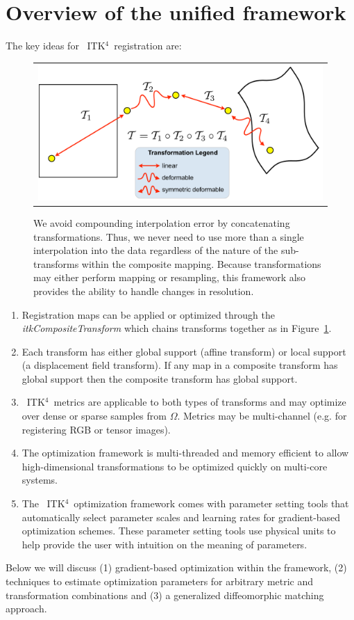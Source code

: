 \documentclass{llncs}
\newcommand{\tk}{~ITK$^{\text{4}}$~}
\begin{document}
\section{Overview of the unified framework}
The key ideas for \tk registration are:
\begin{figure}[t]
\begin{center}
\begin{tabular}{c}
\includegraphics[width=4.5in]{figs/composemap.pdf}
\end{tabular}
\caption{\baselineskip 12pt \small We avoid compounding interpolation
  error by concatenating transformations.  Thus, we never need to use more than
  a single interpolation into the data regardless of the nature of the
  sub-transforms within the composite mapping.  Because transformations may
  either perform mapping or resampling, this framework also
  provides the ability to handle changes in resolution.}
\label{fig:composite}
\end{center}
\end{figure}
\begin{enumerate}
\item Registration maps can be applied or optimized through the {\em
    itkCompositeTransform} which chains transforms together as in Figure~\ref{fig:composite}.
\item Each transform has either global support (affine
  transform) or local support (a displacement field transform).   If
  any map in a composite transform has global support then the
  composite transform has global support.
\item \tk metrics are applicable to both types of transforms and may
  optimize over dense or sparse samples from $\Omega$.  Metrics may be
  multi-channel (e.g. for registering RGB or tensor images).
\item The optimization framework is multi-threaded and memory
  efficient to allow high-dimensional transformations to be optimized
  quickly on multi-core systems.
\item The \tk optimization framework comes with parameter setting tools
  that automatically select parameter scales and learning rates for
  gradient-based optimization schemes.  These parameter setting tools
  use physical units to help provide the user with intuition on the
  meaning of parameters.  
\end{enumerate}
Below we will discuss (1) gradient-based optimization within the
framework, (2) techniques to estimate optimization parameters for
arbitrary metric and transformation combinations and (3) a generalized
diffeomorphic matching approach.  
\end{document}
